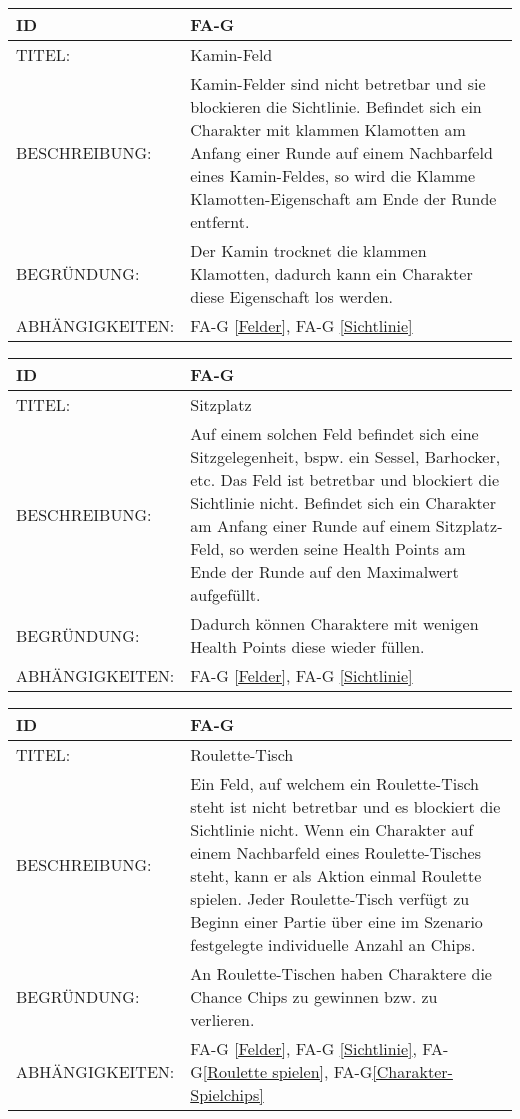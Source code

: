 \begin{tabularx}{16cm}{l|X}
	{table}\label{Kamin-Feld}
	\textbf{ID} & \textbf{FA-G \arabic{table}} \\
	\hline
	TITEL: & Kamin-Feld \\
	\hline
	BESCHREIBUNG: & Kamin-Felder sind nicht betretbar und sie blockieren die Sichtlinie. Befindet sich ein Charakter mit klammen Klamotten am Anfang einer Runde auf einem Nachbarfeld eines Kamin-Feldes, so wird die Klamme Klamotten-Eigenschaft am Ende der Runde entfernt. \\
	\hline
	BEGRÜNDUNG: & Der Kamin trocknet die klammen Klamotten, dadurch kann ein Charakter diese Eigenschaft los werden. \\
	\hline
	ABHÄNGIGKEITEN: & FA-G \ref{Felder}, FA-G \ref{Sichtlinie} \\
\end{tabularx}

\begin{tabularx}{16cm}{l|X}
	{table}\label{Sitzplatz}
	\textbf{ID} & \textbf{FA-G \arabic{table}} \\
	\hline
	TITEL: & Sitzplatz \\
	\hline
	BESCHREIBUNG: & Auf einem solchen Feld befindet sich eine Sitzgelegenheit, bspw. ein Sessel, Barhocker, etc. Das Feld ist betretbar und blockiert die Sichtlinie nicht. Befindet sich ein Charakter am Anfang einer Runde auf einem Sitzplatz-Feld, so werden seine Health Points am Ende der Runde auf den Maximalwert aufgefüllt. \\
	\hline
	BEGRÜNDUNG: & Dadurch können Charaktere mit wenigen Health Points diese wieder füllen. \\
	\hline
	ABHÄNGIGKEITEN: & FA-G \ref{Felder}, FA-G \ref{Sichtlinie} \\
\end{tabularx}


\begin{tabularx}{16cm}{l|X}
	{table}\label{Roulette-Tisch}
	\textbf{ID} & \textbf{FA-G \arabic{table}} \\
	\hline
	TITEL: & Roulette-Tisch \\
	\hline
	BESCHREIBUNG: & Ein Feld, auf welchem ein Roulette-Tisch steht ist nicht betretbar und es blockiert die Sichtlinie nicht. Wenn ein Charakter auf einem Nachbarfeld eines Roulette-Tisches steht, kann er als Aktion einmal Roulette spielen. Jeder Roulette-Tisch verfügt zu Beginn einer Partie über eine im Szenario festgelegte individuelle Anzahl an Chips. \\
	\hline
	BEGRÜNDUNG: & An Roulette-Tischen haben Charaktere die Chance Chips zu gewinnen bzw. zu verlieren. \\
	\hline
	ABHÄNGIGKEITEN: & FA-G \ref{Felder}, FA-G \ref{Sichtlinie}, FA-G\ref{Roulette spielen}, FA-G\ref{Charakter-Spielchips} \\
\end{tabularx}

